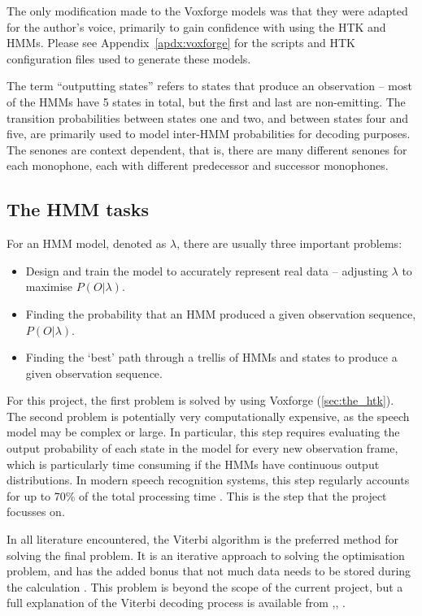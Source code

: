 	The only modification made to the Voxforge models was that they were adapted for the author's voice, primarily to gain confidence with using the HTK and HMMs.  Please see Appendix~\ref{apdx:voxforge} for the scripts and HTK configuration files used to generate these models.

	The term ``outputting states'' refers to states that produce an observation -- most of the HMMs have 5 states in total, but the first and last are non-emitting.  The transition probabilities between states one and two, and between states four and five, are primarily used to model inter-HMM probabilities for decoding purposes.  The senones are context dependent, that is, there are many different senones for each monophone, each with different predecessor and successor monophones.

	\subsection{The HMM tasks} %
	\label{sub:the_hmm_tasks}
		For an HMM model, denoted as $\lambda$, there are usually three important problems: 
		\begin{itemize}
			\item Design and train the model to accurately represent real data -- adjusting $\lambda$ to maximise $P(O | \lambda)$.
			\item Finding the probability that an HMM produced a given observation sequence, $P(O | \lambda)$.
			\item Finding the `best' path through a trellis of HMMs and states to produce a given observation sequence.
		\end{itemize}
		For this project, the first problem is solved by using Voxforge (\ref{sec:the_htk}).  The second problem is potentially very computationally expensive, as the speech model may be complex or large.  In particular, this step requires evaluating the output probability of each state in the model for every new observation frame, which is particularly time consuming if the HMMs have continuous output distributions.  In modern speech recognition systems, this step regularly accounts for up to 70\% of the total processing time \cite{lai2002performance}.  This is the step that the project focusses on.

		In all literature encountered, the Viterbi algorithm is the preferred method for solving the final problem.  It is an iterative approach to solving the optimisation problem, and has the added bonus that not much data needs to be stored during the calculation \cite{schuster2006speech}.  This problem is beyond the scope of the current project, but a full explanation of the Viterbi decoding process is available from \cite{rabiner1989tutorial},\cite{saeed2008advanced}, \cite{young1989token}.

